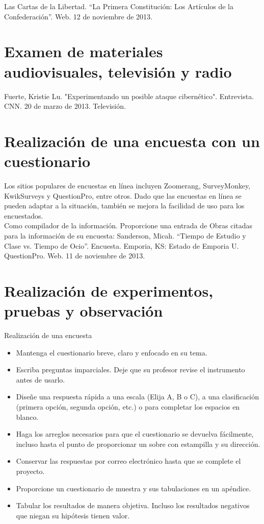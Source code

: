 Las Cartas de la Libertad. “La Primera Constitución: Los Artículos de la Confederación”. Web. 12 de noviembre de 2013.

\section{Examen de materiales audiovisuales, televisión y radio}

Fuerte, Kristie Lu. "Experimentando un posible ataque cibernético". Entrevista. CNN. 20 de marzo de 2013. Televisión.

\section{Realización de una encuesta con un cuestionario}
 Los sitios populares de encuestas en línea incluyen Zoomerang, SurveyMonkey, KwikSurveys y QuestionPro, entre otros. Dado que las encuestas en línea se pueden adaptar a la situación, también se mejora la facilidad de uso para los encuestados.\\

Como compilador de la información. Proporcione una entrada de Obras citadas para la información de su encuesta: Sanderson, Micah. “Tiempo de Estudio y Clase vs. Tiempo de Ocio”. Encuesta. Emporia, KS: Estado de Emporia U. QuestionPro. Web. 11 de noviembre de 2013.\\

\section{Realización de experimentos, pruebas y observación}

Realización de una encuesta
\begin{itemize}
    \item Mantenga el cuestionario breve, claro y enfocado en su tema. 
    \item Escriba preguntas imparciales. Deje que su profesor revise el instrumento antes de usarlo. 
    \item Diseñe una respuesta rápida a una escala (Elija A, B o C), a una clasificación (primera opción, segunda opción, etc.) o para completar los espacios en blanco. 
    \item Haga los arreglos necesarios para que el cuestionario se devuelva fácilmente, incluso hasta el punto de proporcionar un sobre con estampilla y su dirección. 
    \item Conservar las respuestas por correo electrónico hasta que se complete el proyecto. 
    \item Proporcione un cuestionario de muestra y sus tabulaciones en un apéndice. 
    \item Tabular los resultados de manera objetiva. Incluso los resultados negativos que niegan su hipótesis tienen valor.
\end{itemize}

